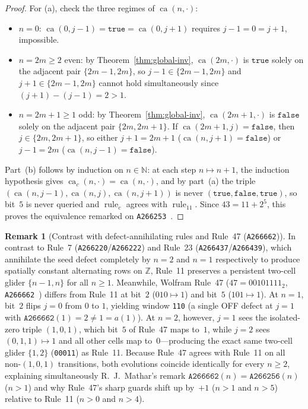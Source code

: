 \documentclass[11pt]{article}
\theoremstyle{definition}
\newtheorem{remark}[theorem]{Remark}
\newcommand{\N}{\mathbb{N}}
\newcommand{\Z}{\mathbb{Z}}
\newcommand{\seq}[1]{\texttt{#1}}
\newcommand{\ruleTT}{\operatorname{rule}_{11}}
\newcommand{\ca}{\operatorname{ca}}
\begin{document}
\begin{proof}
For (a), check the three regimes of $\ca(n, \cdot)$:
\begin{itemize}
\item $n = 0$: $\ca(0, j - 1) = \mathtt{true} = \ca(0, j + 1)$ requires $j - 1 = 0 = j + 1$, impossible.
\item $n = 2m \ge 2$ even: by Theorem~\ref{thm:global-inv}, $\ca(2m, \cdot)$ is $\mathtt{true}$ solely on the adjacent pair $\{2m - 1, 2m\}$, so $j - 1 \in \{2m - 1, 2m\}$ and $j + 1 \in \{2m - 1, 2m\}$ cannot hold simultaneously since $(j + 1) - (j - 1) = 2 > 1$.
\item $n = 2m + 1 \ge 1$ odd: by Theorem~\ref{thm:global-inv}, $\ca(2m + 1, \cdot)$ is $\mathtt{false}$ solely on the adjacent pair $\{2m, 2m + 1\}$. If $\ca(2m + 1, j) = \mathtt{false}$, then $j \in \{2m, 2m + 1\}$, so either $j + 1 = 2m + 1$ ($\ca(n, j + 1) = \mathtt{false}$) or $j - 1 = 2m$ ($\ca(n, j - 1) = \mathtt{false}$).
\end{itemize}
Part~(b) follows by induction on $n \in \N$: at each step $n \mapsto n + 1$, the induction hypothesis gives $\ca_c(n, \cdot) = \ca(n, \cdot)$, and by part~(a) the triple $(\ca(n, j - 1), \ca(n, j), \ca(n, j + 1))$ is never $(\mathtt{true}, \mathtt{false}, \mathtt{true})$, so bit~$5$ is never queried and $\operatorname{rule}_c$ agrees with $\ruleTT$. Since $43 = 11 + 2^5$, this proves the equivalence remarked on \seq{A266253}~\cite{oeis266253}.
\end{proof}

\begin{remark}[Contrast with defect-annihilating rules and Rule~47 (\seq{A266662})]
\label{rem:rule47}
In contrast to Rule~7 (\seq{A266220}/\seq{A266222}) and Rule~23 (\seq{A266437}/\seq{A266439}), which annihilate the seed defect completely by $n = 2$ and $n = 1$ respectively to produce spatially constant alternating rows on $\Z$, Rule~11 preserves a persistent two-cell glider $\{n - 1, n\}$ for all $n \ge 1$. Meanwhile, Wolfram Rule~47 ($47 = 00101111_2$, \seq{A266662}~\cite{oeis266662}) differs from Rule~11 at bit~$2$ ($010 \mapsto 1$) and bit~$5$ ($101 \mapsto 1$). At $n = 1$, bit~$2$ flips $j = 0$ from $0$ to $1$, yielding window \texttt{110} (a single OFF defect at $j = 1$ with $\seq{A266662}(1) = 2 \ne 1 = a(1)$). At $n = 2$, however, $j = 1$ sees the isolated-zero triple $(1, 0, 1)$, which bit~$5$ of Rule~47 maps to~$1$, while $j = 2$ sees $(0, 1, 1) \mapsto 1$ and all other cells map to~$0$---producing the exact same two-cell glider $\{1, 2\}$ (\texttt{00011}) as Rule~11. Because Rule~47 agrees with Rule~11 on all non-$(1, 0, 1)$ transitions, both evolutions coincide identically for every $n \ge 2$, explaining simultaneously R.~J.\ Mathar's remark $\seq{A266662}(n) = \seq{A266256}(n)$ ($n > 1$) and why Rule~47's sharp guards shift up by~$+1$ ($n > 1$ and $n > 5$) relative to Rule~11 ($n > 0$ and $n > 4$).
\end{remark}
\end{document}
